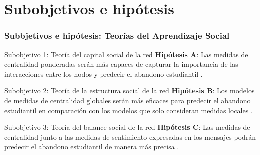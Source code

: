 \documentclass{beamer}
\begin{document}
\section{Subobjetivos e hipótesis}
\begin{frame}
	\frametitle{Subbjetivos e hipótesis: Teorías del Aprendizaje Social}
	\begin{block}{Subobjetivo 1: Teoría del capital social de la red}
		\textbf{Hipótesis A}: Las medidas de centralidad ponderadas serán más capaces de capturar la importancia de las interacciones entre los nodos y predecir el abandono estudiantil \citep{wasko_why_2005, barrat2004a}.
		
	\end{block}
	\begin{block}{Subobjetivo 2: Teoría de la estructura social de la red}
		\textbf{Hipótesis B}: Los modelos de medidas de centralidad globales serán más eficaces para predecir el abandono estudiantil en comparación con los modelos que solo consideran medidas locales \citep{krause_social_2007, abbasi2013a, Mahmoud_2021}.
		
	\end{block}
	\begin{block}{Subobjetivo 3: Teoría del balance social de la red}
		\textbf{Hipótesis C}: Las medidas de centralidad junto a las medidas de sentimiento expresadas en los mensajes podrán predecir el abandono estudiantil de manera más precisa \citep{kim2012a, rawlings_structural_2017, marcos_learning_2019}.
	\end{block}
\end{frame}
\end{document}
